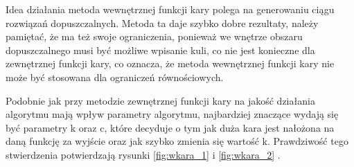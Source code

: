 \documentclass[a4paper,15pt]{article}
\begin{document}
Idea działania metoda wewnętrznej funkcji kary polega na generowaniu ciągu rozwiązań dopuszczalnych. Metoda ta daje szybko dobre rezultaty, należy pamiętać, że ma też swoje ograniczenia, ponieważ we wnętrze obszaru dopuszczalnego musi być możliwe wpisanie kuli, co nie jest konieczne dla zewnętrznej funkcji kary, co oznacza, że metoda wewnętrznej funkcji kary nie może być stosowana dla ograniczeń równościowych. 

Podobnie jak przy metodzie zewnętrznej funkcji kary na jakość działania algorytmu mają wpływ parametry algorytmu, najbardziej znaczące wydają się być parametry k oraz c, które decyduje o tym jak duża kara jest nałożona na daną funkcję za wyjście oraz jak szybko zmienia się wartość k. Prawdziwość tego stwierdzenia potwierdzają rysunki \ref{fig:wkara_1} i \ref{fig:wkara_2} .
\end{document}
